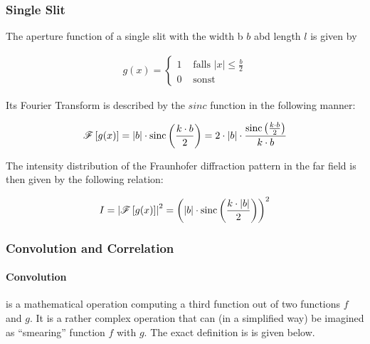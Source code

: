 \subsubsection{Single Slit}

The aperture function of a single slit with the width b $b$ abd length $l$ is given by

\begin{align}
g(x)=\begin{cases}1 &\mbox{ falls }|x|\leq\frac{b}{2}\\0 &\mbox{ sonst }\end{cases}
\end{align}

Its Fourier Transform is described by the $sinc$ function in the following manner:

\begin{align}
\mathscr{F}\left[ g(x) \right] = \left| b\right| \cdot \mathrm{sinc}\left( \frac{k \cdot b}{2}\right)  = 2 \cdot \left| b\right| \cdot \frac{\mathrm{sinc}\left( \frac{k \cdot b}{2}\right)}{k \cdot b}
\end{align}


The intensity distribution of the Fraunhofer diffraction pattern in the far field is then given by the following relation:

\begin{align}
I = \left| \mathscr{F}\left[ g(x) \right]\right| ^2 = \left( \left| b\right| \cdot \mathrm{sinc}\left( \frac{k \cdot \left| b\right| }{2} \right) \right) ^2
\end{align}




\subsubsection{Convolution and Correlation}

\paragraph{Convolution} is a mathematical operation computing a third function out of two functions $f$ and $g$. It is a rather complex operation that can (in a simplified way) be imagined as ``smearing'' function $f$ with $g$. The exact definition is is given below.


